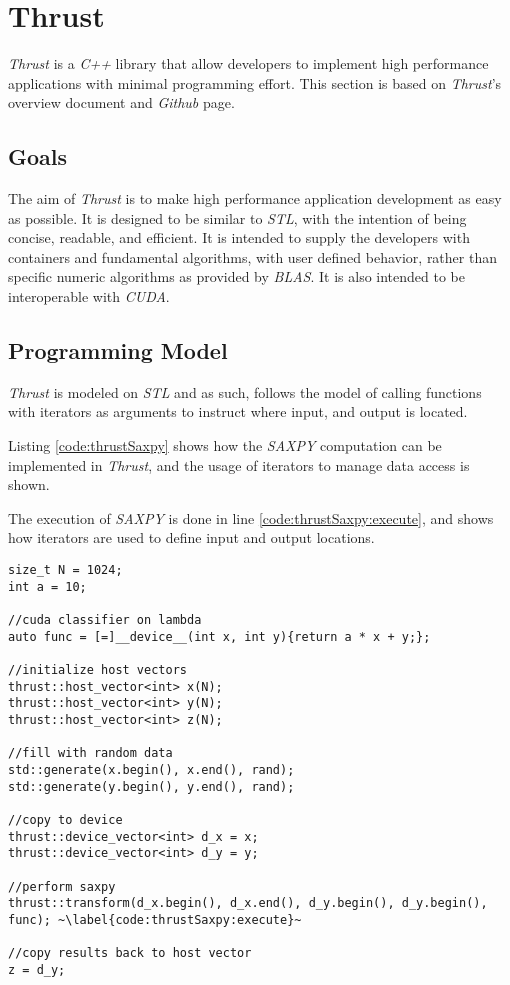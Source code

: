 \section{Thrust}
\textit{Thrust} is a \textit{C++} library that allow developers to implement high performance applications with minimal programming effort. This section is based on \textit{Thrust}'s overview document\cite{thrustOverview} and \textit{Github} page\cite{thrustGithub}.

\subsection{Goals}
The aim of \textit{Thrust} is to make high performance application development as easy as possible. It is designed to be similar to \textit{STL}, with the intention of being concise, readable, and efficient. It is intended to supply the developers with containers and fundamental algorithms, with user defined behavior, rather than specific numeric algorithms as provided by \textit{BLAS}. It is also intended to be interoperable with \textit{CUDA}.

\subsection{Programming Model}
\textit{Thrust} is modeled on \textit{STL} and as such, follows the model of calling functions with iterators as arguments to instruct where input, and output is located.

Listing \ref{code:thrustSaxpy} shows how the \textit{SAXPY} computation can be implemented in \textit{Thrust}, and the usage of iterators to manage data access is shown.

The execution of \textit{SAXPY} is done in line \ref{code:thrustSaxpy:execute}, and shows how iterators are used to define input and output locations.
\begin{lstlisting}[caption={\textit{Thrust} \textit{SAXPY} example.}, label={code:thrustSaxpy}]
size_t N = 1024;
int a = 10;

//cuda classifier on lambda
auto func = [=]__device__(int x, int y){return a * x + y;};

//initialize host vectors
thrust::host_vector<int> x(N);
thrust::host_vector<int> y(N);
thrust::host_vector<int> z(N);

//fill with random data
std::generate(x.begin(), x.end(), rand);
std::generate(y.begin(), y.end(), rand);

//copy to device
thrust::device_vector<int> d_x = x;
thrust::device_vector<int> d_y = y;

//perform saxpy
thrust::transform(d_x.begin(), d_x.end(), d_y.begin(), d_y.begin(), func); ~\label{code:thrustSaxpy:execute}~

//copy results back to host vector
z = d_y;
\end{lstlisting}

